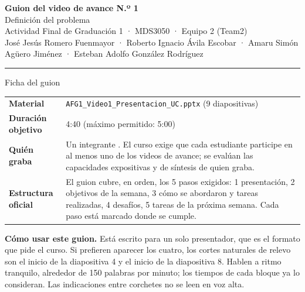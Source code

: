 




\begin{center}
{\color{azul}\LARGE\bfseries Guion del video de avance N.º 1}\\[0.15cm]
{\large Definición del problema}\\[0.25cm]
{\color{tinta2}Actividad Final de Graduación 1 · MDS3050 · Equipo 2 (Team2)}\\
{\color{gris}\small José Jesús Romero Fuenmayor · Roberto Ignacio Ávila Escobar · Amaru Simón Agüero Jiménez · Esteban Adolfo González Rodríguez}\\[0.2cm]
{\color{azul}\rule{\textwidth}{0.8pt}}
\end{center}

\begin{ficha}{Ficha del guion}
\small
\begin{tabular}{@{}L{4.2cm}L{11.6cm}@{}}
\textbf{Material} & \texttt{AFG1\_Video1\_Presentacion\_UC.pptx} (9 diapositivas) \\
\textbf{Duración objetivo} & 4:40 (máximo permitido: 5:00) \\
\textbf{Quién graba} & Un integrante . El curso exige que cada estudiante participe en al menos uno de los videos de avance; se evalúan las capacidades expositivas y de síntesis de quien graba. \\
\textbf{Estructura oficial} & El guion cubre, en orden, los 5 pasos exigidos: 1 presentación, 2 objetivos de la semana, 3 cómo se abordaron y tareas realizadas, 4 desafíos, 5 tareas de la próxima semana. Cada paso está marcado donde se cumple. \\
\end{tabular}
\end{ficha}

\begin{nota}
\small \textbf{Cómo usar este guion.} Está escrito para un solo presentador, que es el formato que pide el curso. Si prefieren aparecer los cuatro, los cortes naturales de relevo son el inicio de la diapositiva 4 y el inicio de la diapositiva 8. Hablen a ritmo tranquilo, alrededor de 150 palabras por minuto; los tiempos de cada bloque ya lo consideran. Las indicaciones entre corchetes no se leen en voz alta.
\end{nota}

